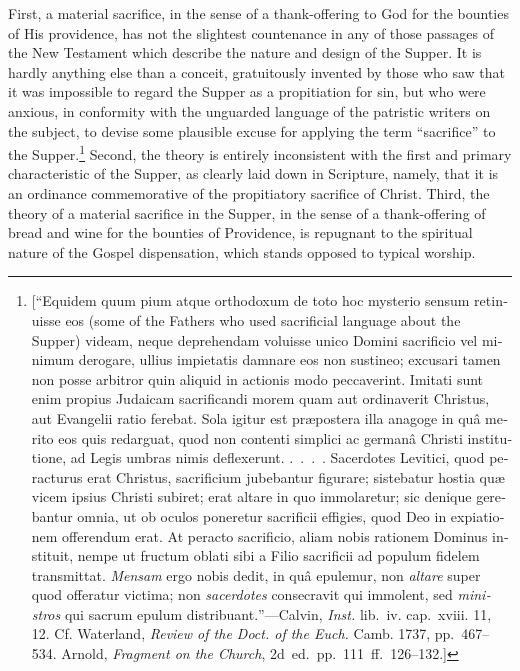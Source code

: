 \documentclass[
]{book}
\begin{document}
First, a material sacrifice, in the sense of a thank-offering to God for the bounties of His providence, has not the slightest countenance in any of those passages of the New Testament which describe the nature and design of the Supper. It is hardly anything else than a conceit, gratuitously invented by those who saw that it was impossible to regard the Supper as a propitiation for sin, but who were anxious, in conformity with the unguarded language of the patristic writers on the subject, to devise some plausible excuse for applying the term ``sacrifice'' to the Supper.\footnote{{[}``\foreignlanguage{latin}{Equidem quum pium atque orthodoxum de toto hoc mysterio sensum retinuisse eos} (some of the Fathers who used sacrificial language about the Supper) \foreignlanguage{latin}{videam, neque deprehendam voluisse unico Domini sacrificio vel minimum derogare, ullius impietatis damnare eos non sustineo; excusari tamen non posse arbitror quin aliquid in actionis modo peccaverint. Imitati sunt enim propius Judaicam sacrificandi morem quam aut ordinaverit Christus, aut Evangelii ratio ferebat. Sola igitur est præpostera illa anagoge in quâ merito eos quis redarguat, quod non contenti simplici ac germanâ Christi institutione, ad Legis umbras nimis deflexerunt. .~.~.~. Sacerdotes Levitici, quod peracturus erat Christus, sacrificium jubebantur figurare; sistebatur hostia quæ vicem ipsius Christi subiret; erat altare in quo immolaretur; sic denique gerebantur omnia, ut ob oculos poneretur sacrificii effigies, quod Deo in expiationem offerendum erat. At peracto sacrificio, aliam nobis rationem Dominus instituit, nempe ut fructum oblati sibi a Filio sacrificii ad populum fidelem transmittat. \emph{Mensam} ergo nobis dedit, in quâ epulemur, non \emph{altare} super quod offeratur victima; non \emph{sacerdotes} consecravit qui immolent, sed \emph{ministros} qui sacrum epulum distribuant.}''---Calvin, \emph{Inst.} lib.~iv. cap.~xviii. 11, 12. Cf. Waterland, \emph{Review of the Doct. of the Euch.} Camb. 1737, pp.~467--534. Arnold, \emph{Fragment on the Church}, 2d~ed.~pp.~111~ff.~126--132.{]}} Second, the theory is entirely inconsistent with the first and primary characteristic of the Supper, as clearly laid down in Scripture, namely, that it is an ordinance commemorative of the propitiatory sacrifice of Christ. Third, the theory of a material sacrifice in the Supper, in the sense of a thank-offering of bread and wine for the bounties of Providence, is repugnant to the spiritual nature of the Gospel dispensation, which stands opposed to typical worship.
\end{document}

